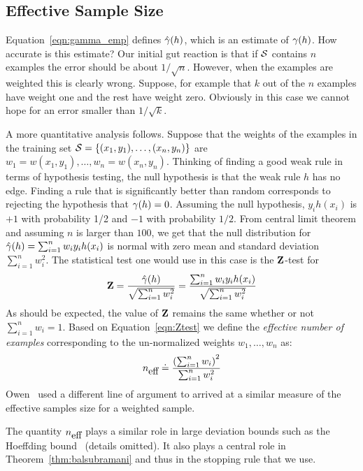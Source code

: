 \subsection{Effective Sample Size}
\label{sec:effectiveSampleSize}
Equation~\ref{eqn:gamma_emp} defines $\hat{\gamma}(h)$, which is an
estimate of $\gamma(h)$. How accurate is this estimate? Our initial
gut reaction is that if ${\cal S}$ contains $n$ examples the error should be
about $1/\sqrt{n}$. However, when the examples are weighted this is
clearly wrong. Suppose, for example that $k$ out of the $n$ examples
have weight one and the rest have weight zero. Obviously in this case
we cannot hope for an error smaller than $1/\sqrt{k}$.

A more quantitative analysis follows. Suppose that the weights of the
examples in the training set ${\cal S}=\{ (x_1, y_1), \ldots, (x_n,
y_n) \}$ are $w_1=w(x_1,y_1),\ldots,w_n=w(x_n,y_n)$. Thinking of
finding a good weak rule in terms of hypothesis testing, the null
hypothesis is that the weak rule $h$ has no edge. Finding a rule that
is significantly better than random corresponds to rejecting the
hypothesis that $\gamma(h)=0$.  Assuming the null hypothesis, $y_i
h(x_i)$ is $+1$ with probability 1/2 and $-1$ with probability
$1/2$. From central limit theorem and assuming $n$ is larger than
$100$, we get that the null distribution for $\hat{\gamma}(h)=\sum_{i=1}^n
w_i y_i h(x_i)$ is normal with zero mean and standard deviation
$\sum_{i=1}^n w_i^2$. The statistical test one would use in this case
is the ${\mathbf Z}$-test for
\begin{equation} \label{eqn:Ztest}
{\mathbf Z} = \frac{\hat{\gamma}(h)}{\sqrt{\sum_{i=1}^n w_i^2}}
= \frac{\sum_{i=1}^n w_i y_i h(x_i)}{\sqrt{\sum_{i=1}^n w_i^2}}
\end{equation}
As should be expected, the value of ${\mathbf Z}$ remains the same whether
or not $\sum_{i=1}^n w_i=1$. Based on Equation~\ref{eqn:Ztest} we
define the {\em effective number of examples} corresponding to the
un-normalized weights $w_1,\ldots,w_n$ as:
\begin{equation} \label{eqn:neff}
  {n_{\mbox{eff}}} \doteq \frac{\left(\sum_{i=1}^n w_i\right)^2}{\sum_{i=1}^n w_i^2}
\end{equation}
Owen~\cite{owen_monte_2013} used a different line of
argument to arrived at a similar measure of
the effective samples size for a weighted sample.

The quantity ${n_{\mbox{eff}}}$ plays a similar role in large deviation bounds
such as the Hoeffding bound~\cite{hoeffding_probability_1963} (details omitted).
It also plays
a central role in Theorem~\ref{thm:balsubramani} and thus in the
stopping rule that we use.

